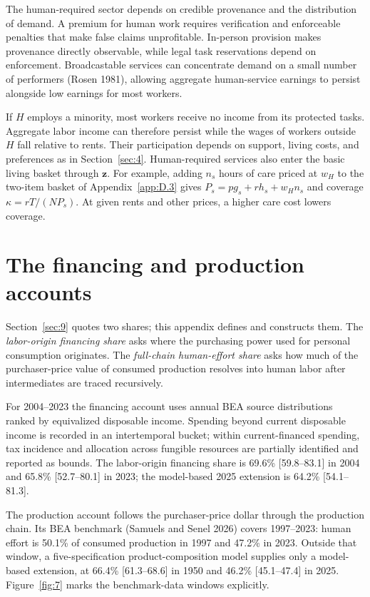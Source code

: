 \documentclass[12pt]{article}
\theoremstyle{plain}
\begin{document}
The human-required sector depends on credible provenance and the distribution of demand. A premium for human work requires verification and enforceable penalties that make false claims unprofitable. In-person provision makes provenance directly observable, while legal task reservations depend on enforcement. Broadcastable services can concentrate demand on a small number of performers (Rosen 1981), allowing aggregate human-service earnings to persist alongside low earnings for most workers.

If $H$ employs a minority, most workers receive no income from its protected tasks. Aggregate labor income can therefore persist while the wages of workers outside $H$ fall relative to rents. Their participation depends on support, living costs, and preferences as in Section~\ref{sec:4}. Human-required services also enter the basic living basket through $\mathbf{z}$. For example, adding $n_s$ hours of care priced at $w_H$ to the two-item basket of Appendix~\ref{app:D.3} gives $P_s=pg_s+rh_s+w_Hn_s$ and coverage $\kappa=rT/(NP_s)$. At given rents and other prices, a higher care cost lowers coverage.

\section{The financing and production accounts}\label{app:F}

Section~\ref{sec:9} quotes two shares; this appendix defines and constructs them. The \emph{labor-origin financing share} asks where the purchasing power used for personal consumption originates. The \emph{full-chain human-effort share} asks how much of the purchaser-price value of consumed production resolves into human labor after intermediates are traced recursively.

For 2004--2023 the financing account uses annual BEA source distributions ranked by equivalized disposable income. Spending beyond current disposable income is recorded in an intertemporal bucket; within current-financed spending, tax incidence and allocation across fungible resources are partially identified and reported as bounds. The labor-origin financing share is 69.6\% [59.8--83.1] in 2004 and 65.8\% [52.7--80.1] in 2023; the model-based 2025 extension is 64.2\% [54.1--81.3].

The production account follows the purchaser-price dollar through the production chain. Its BEA benchmark (Samuels and Senel 2026) covers 1997--2023: human effort is 50.1\% of consumed production in 1997 and 47.2\% in 2023. Outside that window, a five-specification product-composition model supplies only a model-based extension, at 66.4\% [61.3--68.6] in 1950 and 46.2\% [45.1--47.4] in 2025. Figure~\ref{fig:7} marks the benchmark-data windows explicitly.
\end{document}
